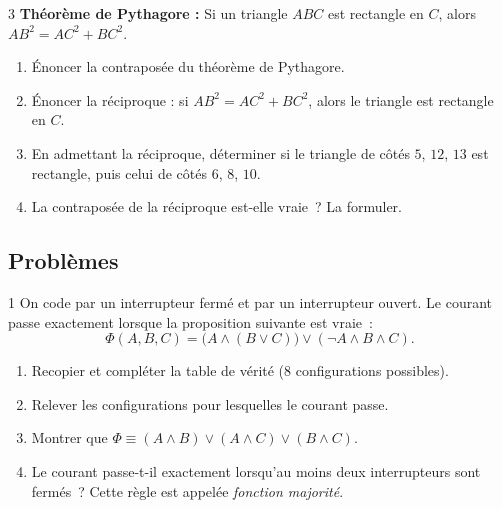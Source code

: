 \begin{exo}{3}
\textbf{Th\'eor\`eme de Pythagore :} Si un triangle $ABC$ est rectangle en $C$,
alors $AB^2 = AC^2 + BC^2$.

\begin{enumerate}
  \item \'Enoncer la contrapos\'ee du th\'eor\`eme de Pythagore.
  \item \'Enoncer la r\'eciproque : si $AB^2 = AC^2 + BC^2$, alors le
        triangle est rectangle en $C$.
  \item En admettant la r\'eciproque, d\'eterminer si le triangle de c\^ot\'es
        $5$, $12$, $13$ est rectangle, puis celui de c\^ot\'es $6$, $8$, $10$.
  \item La contrapos\'ee de la r\'eciproque est-elle vraie~? La formuler.
\end{enumerate}
\end{exo}

\subsection*{Probl\`emes}

\begin{probleme}{1}
On code par \vrai{} un interrupteur ferm\'e et par \faux{} un interrupteur ouvert.
Le courant passe exactement lorsque la proposition suivante est vraie~:
$$\Phi(A,B,C) = \bigl(A \land (B \lor C)\bigr) \lor (\lnot A \land B \land C).$$
\begin{enumerate}
  \item Recopier et compl\'eter la table de v\'erit\'e ($8$ configurations possibles).
  \item Relever les configurations pour lesquelles le courant passe.
  \item Montrer que $\Phi \equiv (A\land B)\lor(A\land C)\lor(B\land C)$.
  \item Le courant passe-t-il exactement lorsqu'au moins deux interrupteurs sont ferm\'es~?
        Cette r\`egle est appel\'ee \emph{fonction majorit\'e}.
\end{enumerate}
\end{probleme}

